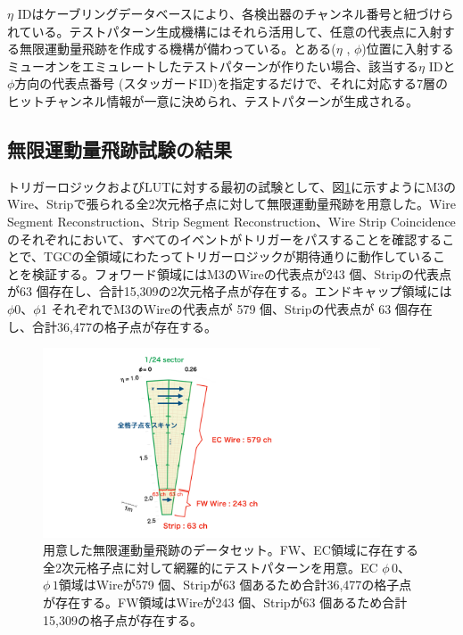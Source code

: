 
$\eta$ IDはケーブリングデータベースにより、各検出器のチャンネル番号と紐づけられている。テストパターン生成機構にはそれら活用して、任意の代表点に入射する無限運動量飛跡を作成する機構が備わっている。とある($\eta$ , $\phi$)位置に入射するミューオンをエミュレートしたテストパターンが作りたい場合、該当する$\eta$ IDと$\phi$方向の代表点番号 (スタッガードID)を指定するだけで、それに対応する7層のヒットチャンネル情報が一意に決められ、テストパターンが生成される。


\subsection*{無限運動量飛跡試験の結果}
トリガーロジックおよびLUTに対する最初の試験として、図\ref{InfMomentum}に示すようにM3のWire、Stripで張られる全2次元格子点に対して無限運動量飛跡を用意した。Wire Segment Reconstruction、Strip Segment Reconstruction、Wire Strip Coincidenceのそれぞれにおいて、すべてのイベントがトリガーをパスすることを確認することで、TGCの全領域にわたってトリガーロジックが期待通りに動作していることを検証する。フォワード領域にはM3のWireの代表点が243 個、Stripの代表点が63 個存在し、合計15,309の2次元格子点が存在する。エンドキャップ領域には$\phi$0、$\phi$1 それぞれでM3のWireの代表点が 579 個、Stripの代表点が 63 個存在し、合計36,477の格子点が存在する。

\begin{figure} 
\centering
\includegraphics[width=10cm]{fig/Test/InfMomentum.pdf}
\caption[用意した無限運動量飛跡のデータセット]{用意した無限運動量飛跡のデータセット。FW、EC領域に存在する全2次元格子点に対して網羅的にテストパターンを用意。EC $\phi\,0$、$\phi\,1$領域はWireが579 個、Stripが63 個あるため合計36,477の格子点が存在する。FW領域はWireが243 個、Stripが63 個あるため合計15,309の格子点が存在する。}
\label{InfMomentum}
\end{figure}

